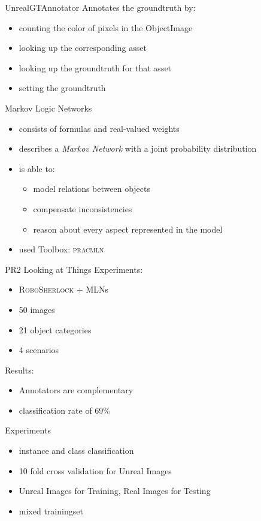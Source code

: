 \documentclass[]{beamer}
\begin{document}
\begin{frame}{UnrealGTAnnotator}
Annotates the groundtruth by:
	\begin{itemize}
		\item counting the color of pixels in the ObjectImage
		\item looking up the corresponding asset 
		\item looking up the groundtruth for that asset
		\item setting the groundtruth 
	\end{itemize}

\end{frame}


\begin{frame}{Markov Logic Networks}
	\begin{itemize}
		\item consists of formulas and real-valued weights
		\item describes a \textit{Markov Network} with a joint probability distribution
		\item is able to:
		\begin{itemize}
			\item model relations between objects
			\item compensate inconsistencies
			\item reason about every aspect represented in the model
		\end{itemize}
		\item used Toolbox: \textsc{pracmln}
	\end{itemize}
\end{frame}

\begin{frame}{PR2 Looking at Things}
Experiments:
	\begin{itemize}
		\item \textsc{RoboSherlock} + MLNs
		\item 50 images 
		\item 21 object categories
		\item 4 scenarios
	\end{itemize}
\bigskip
Results:
	\begin{itemize}
		\item Annotators are complementary
		\item classification rate of 69\%
	\end{itemize}
\end{frame}

\begin{frame}{Experiments}
	\begin{itemize}
		\item instance and class classification
		\item 10 fold cross validation for Unreal Images
		\item Unreal Images for Training, Real Images for Testing
		\item mixed trainingset
	\end{itemize}
\end{frame}
\end{document}
